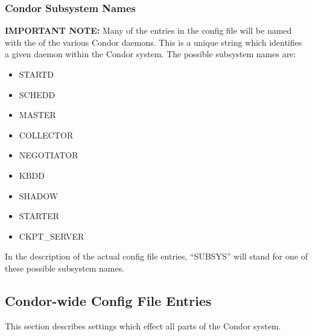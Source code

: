 \subsubsection{Condor Subsystem Names}
\label{sec:Condor-Subsystem-Names}

\textbf{IMPORTANT NOTE:} Many of the entries in the config file will
be named with the  of the various Condor daemons.
This is a unique string which identifies a given daemon within the
Condor system.  The possible subsystem names are:

\begin{itemize}
\item STARTD
\item SCHEDD
\item MASTER
\item COLLECTOR
\item NEGOTIATOR
\item KBDD 
\item SHADOW
\item STARTER
\item CKPT\_SERVER
\label{list:subsystem names}
\end{itemize}

In the description of the actual config file entries, ``SUBSYS'' will
stand for one of these possible subsystem names.

\subsection{Condor-wide Config File Entries}
\label{sec:Condor-wide-Config-File-Entries}
This section describes settings which effect all parts of the Condor
system. 

